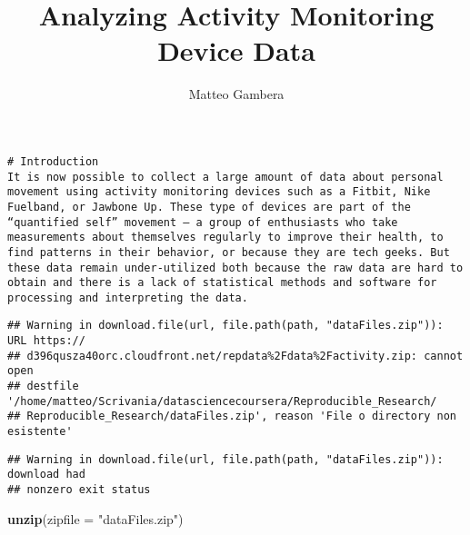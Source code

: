 \documentclass[]{article}
\title{Analyzing Activity Monitoring Device Data}
\author{Matteo Gambera}
\date{}
\newenvironment{Shaded}{\begin{snugshade}}{\end{snugshade}}
\newcommand{\KeywordTok}[1]{\textcolor[rgb]{0.13,0.29,0.53}{\textbf{#1}}}
\newcommand{\DataTypeTok}[1]{\textcolor[rgb]{0.13,0.29,0.53}{#1}}
\newcommand{\StringTok}[1]{\textcolor[rgb]{0.31,0.60,0.02}{#1}}
\newcommand{\NormalTok}[1]{#1}
\begin{document}
\maketitle

\begin{verbatim}
# Introduction
It is now possible to collect a large amount of data about personal movement using activity monitoring devices such as a Fitbit, Nike Fuelband, or Jawbone Up. These type of devices are part of the “quantified self” movement – a group of enthusiasts who take measurements about themselves regularly to improve their health, to find patterns in their behavior, or because they are tech geeks. But these data remain under-utilized both because the raw data are hard to obtain and there is a lack of statistical methods and software for processing and interpreting the data.
\end{verbatim}

\begin{Shaded}
\end{Shaded}

\begin{verbatim}
## Warning in download.file(url, file.path(path, "dataFiles.zip")): URL https://
## d396qusza40orc.cloudfront.net/repdata%2Fdata%2Factivity.zip: cannot open
## destfile '/home/matteo/Scrivania/datasciencecoursera/Reproducible_Research/
## Reproducible_Research/dataFiles.zip', reason 'File o directory non esistente'
\end{verbatim}

\begin{verbatim}
## Warning in download.file(url, file.path(path, "dataFiles.zip")): download had
## nonzero exit status
\end{verbatim}

\begin{Shaded}
\begin{Highlighting}[]
\KeywordTok{unzip}\NormalTok{(}\DataTypeTok{zipfile =} \StringTok{"dataFiles.zip"}\NormalTok{)}
\end{Highlighting}
\end{Shaded}
\end{document}
